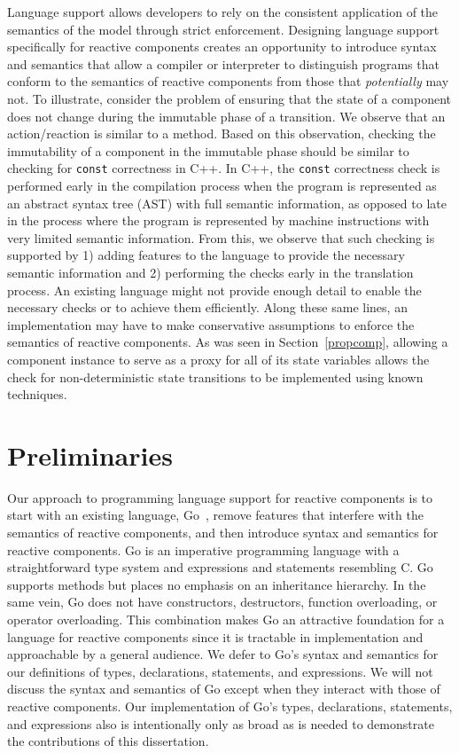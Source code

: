 Language support allows developers to rely on the consistent application of the semantics of the model through strict enforcement.
Designing language support specifically for reactive components creates an opportunity to introduce syntax and semantics that allow a compiler or interpreter to distinguish programs that conform to the semantics of reactive components from those that \emph{potentially} may not.
To illustrate, consider the problem of ensuring that the state of a component does not change during the immutable phase of a transition.
We observe that an action/reaction is similar to a method.
Based on this observation, checking the immutability of a component in the immutable phase should be similar to checking for \verb+const+ correctness in C++.
In C++, the \verb+const+ correctness check is performed early in the compilation process when the program is represented as an abstract syntax tree (AST) with full semantic information, as opposed to late in the process where the program is represented by machine instructions with very limited semantic information.
From this, we observe that such checking is supported by 1) adding features to the language to provide the necessary semantic information and 2) performing the checks early in the translation process.
An existing language might not provide enough detail to enable the necessary checks or to achieve them efficiently.
Along these same lines, an implementation may have to make conservative assumptions to enforce the semantics of reactive components.
As was seen in Section~\ref{propcomp}, allowing a component instance to serve as a proxy for all of its state variables allows the check for non-deterministic state transitions to be implemented using known techniques.

\section{Preliminaries}

Our approach to programming language support for reactive components is to start with an existing language, Go~\cite{go}, remove features that interfere with the semantics of reactive components, and then introduce syntax and semantics for reactive components.
Go is an imperative programming language with a straightforward type system and expressions and statements resembling C.
Go supports methods but places no emphasis on an inheritance hierarchy.
In the same vein, Go does not have constructors, destructors, function overloading, or operator overloading.
This combination makes Go an attractive foundation for a language for reactive components since it is tractable in implementation and approachable by a general audience.
We defer to Go's syntax and semantics for our definitions of types, declarations, statements, and expressions.
We will not discuss the syntax and semantics of Go except when they interact with those of reactive components.
Our implementation of Go's types, declarations, statements, and expressions also is intentionally only as broad as is needed to demonstrate the contributions of this dissertation.

